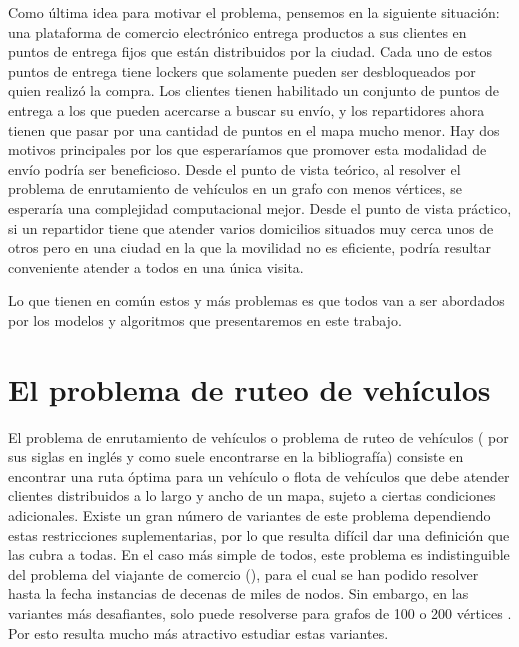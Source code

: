 Como última idea para motivar el problema, pensemos en la siguiente situación: una plataforma de comercio electrónico entrega productos a sus clientes en puntos de entrega fijos que están distribuidos por la ciudad. Cada uno de estos puntos de entrega tiene lockers que solamente pueden ser desbloqueados por quien realizó la compra. Los clientes tienen habilitado un conjunto de puntos de entrega a los que pueden acercarse a buscar su envío, y los repartidores ahora tienen que pasar por una cantidad de puntos en el mapa mucho menor. Hay dos motivos principales por los que esperaríamos que promover esta modalidad de envío podría ser beneficioso. Desde el punto de vista teórico, al resolver el problema de enrutamiento de vehículos en un grafo con menos vértices, se esperaría una complejidad computacional mejor. Desde el punto de vista práctico, si un repartidor tiene que atender varios domicilios situados muy cerca unos de otros pero en una ciudad en la que la movilidad no es eficiente, podría resultar conveniente atender a todos en una única visita. 

Lo que tienen en común estos y más problemas es que todos van a ser abordados por los modelos y algoritmos que presentaremos en este trabajo.  


\section{El problema de ruteo de vehículos}

El problema de enrutamiento de vehículos o problema de ruteo de vehículos ( por sus siglas en inglés y como suele encontrarse en la bibliografía) consiste en encontrar una ruta óptima para un vehículo o flota de vehículos que debe atender clientes distribuidos a lo largo y ancho de un mapa, sujeto a ciertas condiciones adicionales. Existe un gran número de variantes de este problema dependiendo estas restricciones suplementarias, por lo que resulta difícil dar una definición que las cubra a todas. En el caso más simple de todos, este problema es indistinguible del problema del viajante de comercio (), para el cual se han podido resolver hasta la fecha instancias de decenas de miles de nodos. Sin embargo, en las variantes más desafiantes,  solo puede resolverse para grafos de 100 o 200 vértices \cite{laporte}. Por esto resulta mucho más atractivo estudiar estas variantes.


